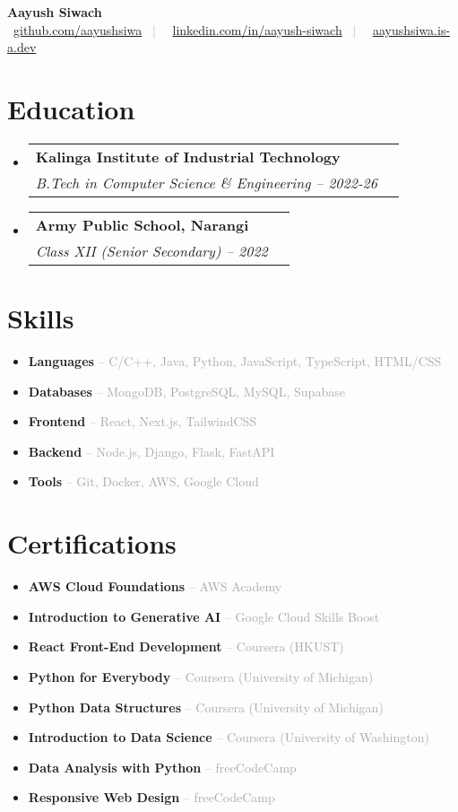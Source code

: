 \documentclass[letterpaper,11pt]{article}
\makeatletter
\newcommand{\customitem}{\item[\color{mainblue}\ding{2}]}
\newcommand{\resumeItem}[1]{\customitem\small{#1 \vspace{-1pt}}}
\newcommand{\resumeSubheading}[4]{
  \vspace{-1pt}\item
    \begin{tabular*}{0.97\textwidth}[t]{l@{\extracolsep{\fill}}r}
      \textbf{\color{darkgray}#1} & #2 \\
      \textit{\small\color{darkgray}#3} & \\
    \end{tabular*}\vspace{-5pt}
}
\newcommand{\resumeSubHeadingListStart}{\begin{itemize}[leftmargin=0.15in, label={}, itemsep=6pt]}
\newcommand{\resumeSubHeadingListEnd}{\end{itemize}}
\newcommand{\resumeItemListStart}{\begin{itemize}[leftmargin=0.15in, label={}, itemsep=3pt]}
\newcommand{\resumeItemListEnd}{\end{itemize}\vspace{-2pt}}
\newcommand{\skillbar}[2]{
  \textbf{#1} \hfill
  \begin{tikzpicture}[baseline=0.5ex]
    \fill[lightgray] (0,0) rectangle (5,0.25);
    \fill[mainblue] (0,0) rectangle (#2,0.25);
  \end{tikzpicture}\\[-0.2cm]
}
\makeatother
\begin{document}
\begin{center}
    {\Huge \textbf{\textcolor{mainblue}{Aayush Siwach}}} \\
    \vspace{6pt}
    \small
    \textcolor{darkgray}{
    \faGithub\ \href{https://github.com/aayushsiwa}{github.com/aayushsiwa} \ | \
    \faLinkedin\ \href{https://linkedin.com/in/aayush-siwach}{linkedin.com/in/aayush-siwach} \ | \
    \faGlobe\ \href{https://aayushsiwa.is-a.dev}{aayushsiwa.is-a.dev}}
\end{center}
\vspace{-4pt}
\begin{paracol}{2}
\section{Education}
\resumeSubHeadingListStart
\vspace{1pt}
  \resumeSubheading
    {Kalinga Institute of Industrial Technology}{}
    {B.Tech in Computer Science \& Engineering -- 2022-26}{}
  \resumeSubheading
    {Army Public School, Narangi}{}
    {Class XII (Senior Secondary) -- 2022}{}
\resumeSubHeadingListEnd
\section{Skills}
\resumeItemListStart
\vspace{1pt}
  \resumeItem{\textbf{Languages} \textcolor{darkgray}{-- C/C++, Java, Python, JavaScript, TypeScript, HTML/CSS}}
  \resumeItem{\textbf{Databases} \textcolor{darkgray}{-- MongoDB, PostgreSQL, MySQL, Supabase}}
  \resumeItem{\textbf{Frontend} \textcolor{darkgray}{-- React, Next.js, TailwindCSS}}
  \resumeItem{\textbf{Backend} \textcolor{darkgray}{-- Node.js, Django, Flask, FastAPI}}
  \resumeItem{\textbf{Tools} \textcolor{darkgray}{-- Git, Docker, AWS, Google Cloud}}
\resumeItemListEnd
\section{Certifications}
\resumeItemListStart
\vspace{2pt}
  \resumeItem{\textbf{AWS Cloud Foundations} \textcolor{darkgray}{-- AWS Academy}}
  \resumeItem{\textbf{Introduction to Generative AI} \textcolor{darkgray}{-- Google Cloud Skills Boost}}
  \resumeItem{\textbf{React Front-End Development} \textcolor{darkgray}{-- Coursera (HKUST)}}
  \resumeItem{\textbf{Python for Everybody} \textcolor{darkgray}{-- Coursera (University of Michigan)}}
  \resumeItem{\textbf{Python Data Structures} \textcolor{darkgray}{-- Coursera (University of Michigan)}}
  \resumeItem{\textbf{Introduction to Data Science} \textcolor{darkgray}{-- Coursera (University of Washington)}}
  \resumeItem{\textbf{Data Analysis with Python} \textcolor{darkgray}{-- freeCodeCamp}}
  \resumeItem{\textbf{Responsive Web Design} \textcolor{darkgray}{-- freeCodeCamp}}
\resumeItemListEnd
\switchcolumn

\end{paracol}
\end{document}
